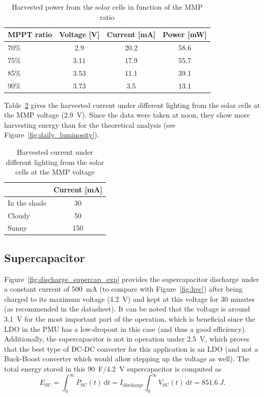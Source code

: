 \documentclass{EPL-master-thesis-covers-EN}
\newcommand{\te}[1]{\textrm{#1}}
\begin{document}
\begin{table}[H]
\centering
\begin{tabular}{lccc}
\toprule
  MPPT ratio & Voltage [V] & Current [mA] & Power [mW]  \\ \midrule
 70\%        & 2.9         & 20.2         & 58.6        \\
 75\%        & 3.11        & 17.9         & 55.7        \\
 85\%        & 3.53        & 11.1         & 39.1        \\
 90\%        & 3.73        & 3.5          & 13.1        \\ \bottomrule
\end{tabular}
\caption{Harvested power from the solar cells in function of the MMP ratio}
\label{tab:val_current_solar_sel}
\end{table}


Table~\ref{tab:val_current_harvested} gives the harvested current under different lighting from the solar cells at the MMP voltage (\SI{2.9}{V}). Since the data were taken at noon, they show more harvesting energy than for the theoretical analysis (see Figure~\ref{fig:daily_luminosity}).

\begin{table}[H]
\centering
\begin{tabular}{lc}
\toprule
                     & Current [\si{mA}]  \\ \midrule
 In the shade        & 30                 \\
 Cloudy              & 50                 \\
 Sunny               & 150                \\ \bottomrule
\end{tabular}
\caption{Harvested current under different lighting from the solar cells at the MMP voltage}
\label{tab:val_current_harvested}
\end{table}

\subsection*{Supercapacitor}

Figure~\ref{fig:discharge_supercap_exp} provides the supercapacitor discharge under a constant current of \SI{500}{mA} (to compare with Figure~\ref{fig:hvc}) after being charged to its maximum voltage (\SI{4.2}{V}) and kept at this voltage for 30 minutes (as recommended in the datasheet). It can be noted that the voltage is around \SI{3.1}{V} for the most important part of the operation, which is beneficial since the LDO in the PMU has a low-dropout in this case (and thus a good efficiency). Additionally, the supercapacitor is not in operation under \SI{2.5}{V}, which proves that the best type of DC-DC converter for this application is an LDO (and not a Buck-Boost converter which would allow stepping up the voltage as well). The total energy stored in this \SI{90}{F}/\SI{4.2}{V} supercapacitor is computed as
\[
 E_\te{SC} = \int_0^\infty P_\te{SC}(t) \, \te{d} t = I_\te{discharge} \int_0^\infty V_\te{SC}(t) \, \te{d} t = \SI{851.6}{J}.
\]
\end{document}
